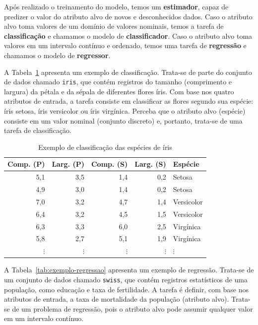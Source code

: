 Após realizado o treinamento do modelo, temos um \textbf{estimador}, capaz de predizer o valor do atributo alvo de novos e desconhecidos dados. Caso o atributo alvo toma valores de um domínio de valores nominais, temos a tarefa de \textbf{classificação} e chamamos o modelo de \textbf{classificador}. Caso o atributo alvo toma valores em um intervalo contínuo e ordenado, temos uma tarefa de \textbf{regressão} e chamamos o modelo de \textbf{regressor}.

A Tabela~\ref{tab:exemplo-classificacao} apresenta um exemplo de classificação. Trata-se de parte do conjunto de dados chamado \texttt{iris}, que contém registros do tamanho (comprimento e largura) da pétala e da sépala de diferentes flores íris. Com base nos quatro atributos de entrada, a tarefa consiste em classificar as flores segundo sua espécie: íris setosa, íris versicolor ou íris virgínica. Perceba que o atributo alvo (espécie) consiste em um valor nominal (conjunto discreto) e, portanto, trata-se de uma tarefa de classificação.

\begin{table}[h]
	\centering
	
	\begin{tabular}{rrrrl}
		\hline
		\textbf{Comp. (P)} & \textbf{Larg. (P)} & \textbf{Comp. (S)} & \textbf{Larg. (S)} & \textbf{Espécie} \\
		\hline
		5,1 & 3,5 & 1,4 & 0,2 & Setosa \\
		4,9 & 3,0 & 1,4 & 0,2 & Setosa \\
		7,0 & 3,2 & 4,7 & 1,4 & Versicolor \\
		6,4 & 3,2 & 4,5 & 1,5 & Versicolor \\
		6,3 & 3,3 & 6,0 & 2,5 & Virgínica \\
		5,8 & 2,7 & 5,1 & 1,9 & Virgínica \\
		$\vdots$ & $\vdots$ & $\vdots$ & $\vdots$ & $\vdots$ \\
		\hline
	\end{tabular}
	
	\caption{Exemplo de classificação das espécies de íris}
	\label{tab:exemplo-classificacao}
\end{table}

A Tabela~\ref{tab:exemplo-regressao} apresenta um exemplo de regressão. Trata-se de um conjunto de dados chamado \texttt{swiss}, que contém registros estatísticos de uma população, como educação e taxa de fertilidade. A tarefa é definir, com base nos atributos de entrada, a taxa de mortalidade da população (atributo alvo). Trata-se de um problema de regressão, pois o atributo alvo pode assumir qualquer valor em um intervalo contínuo.

